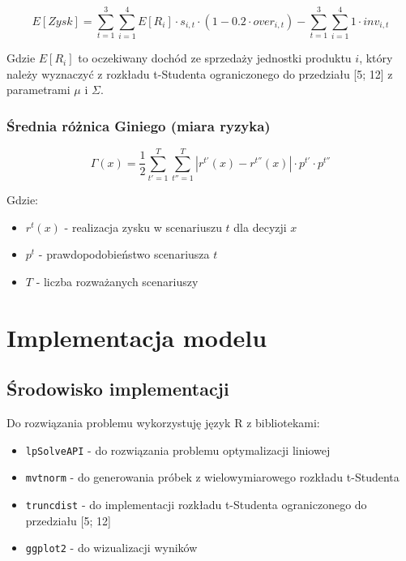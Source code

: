 \documentclass[12pt]{article}
\begin{document}
\begin{equation}
E[Zysk] = \sum_{t=1}^{3} \sum_{i=1}^{4} E[R_i] \cdot s_{i,t} \cdot (1 - 0.2 \cdot over_{i,t}) - \sum_{t=1}^{3} \sum_{i=1}^{4} 1 \cdot inv_{i,t}
\end{equation}

Gdzie $E[R_i]$ to oczekiwany dochód ze sprzedaży jednostki produktu $i$, który należy wyznaczyć z rozkładu t-Studenta ograniczonego do przedziału [5; 12] z parametrami $\mu$ i $\Sigma$.

\subsubsection{Średnia różnica Giniego (miara ryzyka)}

\begin{equation}
\Gamma(x) = \frac{1}{2} \sum_{t'=1}^{T} \sum_{t''=1}^{T} |r^{t'}(x) - r^{t''}(x)| \cdot p^{t'} \cdot p^{t''}
\end{equation}

Gdzie:
\begin{itemize}
  \item $r^t(x)$ - realizacja zysku w scenariuszu $t$ dla decyzji $x$
  \item $p^t$ - prawdopodobieństwo scenariusza $t$
  \item $T$ - liczba rozważanych scenariuszy
\end{itemize}

\section{Implementacja modelu}

\subsection{Środowisko implementacji}

Do rozwiązania problemu wykorzystuję język R z bibliotekami:
\begin{itemize}
  \item \texttt{lpSolveAPI} - do rozwiązania problemu optymalizacji liniowej
  \item \texttt{mvtnorm} - do generowania próbek z wielowymiarowego rozkładu t-Studenta
  \item \texttt{truncdist} - do implementacji rozkładu t-Studenta ograniczonego do przedziału [5; 12]
  \item \texttt{ggplot2} - do wizualizacji wyników
\end{itemize}
\end{document}
